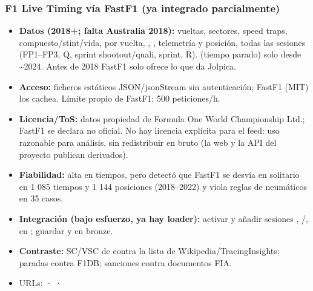 \subsubsection{F1 Live Timing vía FastF1 (ya integrado parcialmente)}

\begin{itemize}
\item \textbf{Datos (2018+; falta Australia 2018):} vueltas, sectores, speed traps, compuesto/stint/vida,  por vuelta, , , telemetría y posición, todas las sesiones (FP1–FP3, Q, sprint shootout/quali, sprint, R).  (tiempo parado) solo desde \textasciitilde{}2024. Antes de 2018 FastF1 solo ofrece lo que da Jolpica.
\item \textbf{Acceso:} ficheros estáticos JSON/jsonStream sin autenticación; FastF1 (MIT) los cachea. Límite propio de FastF1: 500 peticiones/h.
\item \textbf{Licencia/ToS:} datos propiedad de Formula One World Championship Ltd.; FastF1 se declara no oficial. No hay licencia explícita para el feed: uso razonable para análisis, sin redistribuir en bruto (la web y la API del proyecto publican derivados).
\item \textbf{Fiabilidad:} alta en tiempos, pero  detectó que FastF1 se desvía en solitario en 1 085 tiempos y 1 144 posiciones (2018–2022) y viola reglas de neumáticos en 35 casos.
\item \textbf{Integración (bajo esfuerzo, ya hay loader):} activar  y añadir sesiones , /,  en ; guardar  y  en bronze.
\item \textbf{Contraste:} SC/VSC de  contra la lista de Wikipedia/TracingInsights; paradas contra F1DB; sanciones contra documentos FIA.
\item URLs: \href{https://docs.fastf1.dev/}{} · \href{https://github.com/theOehrly/Fast-F1}{} · \href{https://livetiming.formula1.com/static/2018/Index.json}{}
\end{itemize}

